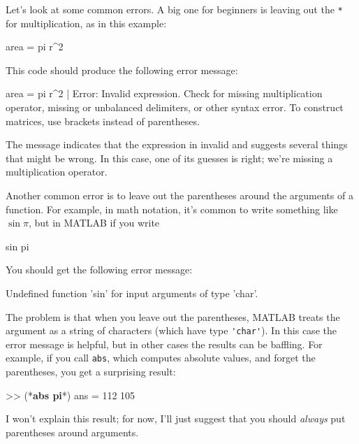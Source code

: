 Let's look at some common errors. A big one for beginners is leaving out the \lstinline{*}
for multiplication, as in this example:

\begin{code}
area = pi r^2
\end{code}

This code should produce the following error message:

\begin{stdout}
 area = pi r^2
           |
Error: Invalid expression. Check for missing multiplication 
operator, missing or unbalanced delimiters, or other syntax 
error. To construct matrices, use brackets instead of parentheses.
\end{stdout}


The message indicates that the expression in invalid and suggests several things that might be wrong.
In this case, one of its guesses is right; we're missing a multiplication operator.


Another common error is to leave out the parentheses around the
arguments of a function.  For example, in math notation, it's common
to write something like $\sin \pi$, but in MATLAB if you write

\begin{code}
sin pi
\end{code}

You should get the following error message:

\begin{stdout}
Undefined function 'sin' for input arguments of type 'char'.
\end{stdout}

The problem is that when you leave out the parentheses, MATLAB treats
the argument as a string of characters (which have type \lstinline{'char'}).
In this case the error message is helpful, but in other cases the results can be baffling.
For example, if you call \lstinline{abs}, which computes absolute values, and forget the parentheses, you get a surprising result:

\begin{code}
>> (*\textbf{abs pi}*)
ans =  112   105
\end{code}

I won't explain this result; for now, I'll just suggest that you should \emph{always} put parentheses around arguments.

